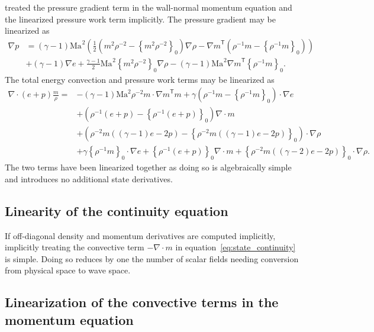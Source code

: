 \documentclass[letterpaper,11pt,nointlimits,reqno,draft]{amsbook}
\newcommand{\trans}[1]{{#1}^{\ensuremath{\mathsf{T}}}}
\newcommand{\Mach}[1][]{\ensuremath{\mbox{Ma}_{#1}}}
\newcommand{\reference}[1]{\ensuremath{\left\{#1\right\}_{0}}}
\newcommand{\lessreference}[1]
  {\ensuremath{\left({#1}-\reference{#1}\right)}}
\begin{document}
\citet[page~45]{Guarini1998} treated the pressure gradient term in the
wall-normal momentum equation and the linearized pressure work term implicitly.
The pressure gradient may be linearized as
\begin{align}
  \nabla{}p &= \left(\gamma-1\right)\Mach^{2}\left(
      \frac{1}{2} \lessreference{m^{2}\rho^{-2}}\nabla\rho
    - \trans{\nabla{}m}\lessreference{\rho^{-1}m}
  \right)
\\
&+ \left(\gamma-1\right) \nabla{}e
 + \frac{\gamma-1}{2}\Mach^{2} \reference{m^{2}\rho^{-2}}\nabla\rho
 - \left(\gamma-1\right)\Mach^{2} \trans{\nabla{}m}\reference{\rho^{-1}m}
 .
\end{align}
The total energy convection and pressure work terms may be linearized as
\begin{align}
\nabla\cdot\left(e+p\right)\frac{m}{\rho} =
   &- \left(\gamma-1\right)\mbox{Ma}^{2}\rho^{-2}m\cdot \trans{\nabla{}m}m
    + \gamma\lessreference{ \rho^{-1}m }\cdot\nabla{}e
  \\
   &+ \lessreference{
        \rho^{-1}\left(e+p\right)
      } \nabla\cdot{}m
  \\
   &+ \lessreference{
        \rho^{-2}m\left(\left(\gamma-1\right)e-2p\right)
      }\cdot\nabla\rho
  \\
   &+ \gamma\reference{
        \rho^{-1}m
      }\cdot\nabla{}e
    + \reference{
        \rho^{-1}\left(e+p\right)
      }\nabla\cdot{}m
    + \reference{
        \rho^{-2}m\left(\left(\gamma-2\right)e-2p\right)
      }\cdot\nabla\rho
.
\end{align}
The two terms have been linearized together as doing so is algebraically simple
and introduces no additional state derivatives.

\subsection{Linearity of the continuity equation}
\label{sec:contconv}

If off-diagonal density and momentum derivatives are computed implicitly,
implicitly treating the convective term $-\nabla\cdot{}m$ in
equation~\eqref{eq:state_continuity} is simple.  Doing so reduces by one the
number of scalar fields needing conversion from physical space to wave space.

\subsection{Linearization of the convective terms in the momentum equation}
\label{sec:momtconv}
\end{document}
